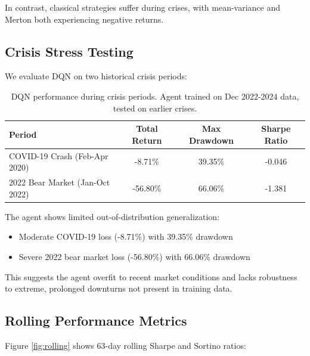 \documentclass[12pt]{article}
\begin{document}
In contrast, classical strategies suffer during crises, with mean-variance and Merton both experiencing negative returns.

\subsection{Crisis Stress Testing}

We evaluate DQN on two historical crisis periods:

\begin{table}[h]
\centering
\begin{tabular}{lccc}
\toprule
\textbf{Period} & \textbf{Total Return} & \textbf{Max Drawdown} & \textbf{Sharpe Ratio} \\
\midrule
COVID-19 Crash (Feb-Apr 2020) & -8.71\% & 39.35\% & -0.046 \\
2022 Bear Market (Jan-Oct 2022) & -56.80\% & 66.06\% & -1.381 \\
\bottomrule
\end{tabular}
\caption{DQN performance during crisis periods. Agent trained on Dec 2022-2024 data, tested on earlier crises.}
\label{tab:crisis}
\end{table}

The agent shows limited out-of-distribution generalization:
\begin{itemize}
    \item Moderate COVID-19 loss (-8.71\%) with 39.35\% drawdown
    \item Severe 2022 bear market loss (-56.80\%) with 66.06\% drawdown
\end{itemize}

This suggests the agent overfit to recent market conditions and lacks robustness to extreme, prolonged downturns not present in training data.

\subsection{Rolling Performance Metrics}

Figure \ref{fig:rolling} shows 63-day rolling Sharpe and Sortino ratios:
\end{document}
